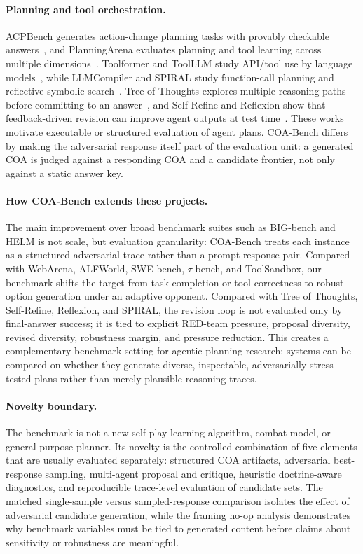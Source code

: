 \documentclass[letterpaper]{article}
\begin{document}
\paragraph{Planning and tool orchestration.}
ACPBench generates action-change planning tasks with provably checkable answers~\citep{kokel2025acpbench}, and PlanningArena evaluates planning and tool learning across multiple dimensions~\citep{zheng2025planningarena}. Toolformer and ToolLLM study API/tool use by language models~\citep{schick2023toolformer,qin2024toolllm}, while LLMCompiler and SPIRAL study function-call planning and reflective symbolic search~\citep{kim2024llmcompiler,zhang2026spiral}. Tree of Thoughts explores multiple reasoning paths before committing to an answer~\citep{yao2023tree}, and Self-Refine and Reflexion show that feedback-driven revision can improve agent outputs at test time~\citep{madaan2023selfrefine,shinn2023reflexion}. These works motivate executable or structured evaluation of agent plans. COA-Bench differs by making the adversarial response itself part of the evaluation unit: a generated COA is judged against a responding COA and a candidate frontier, not only against a static answer key.

\paragraph{How COA-Bench extends these projects.}
The main improvement over broad benchmark suites such as BIG-bench and HELM is not scale, but evaluation granularity: COA-Bench treats each instance as a structured adversarial trace rather than a prompt-response pair. Compared with WebArena, ALFWorld, SWE-bench, $\tau$-bench, and ToolSandbox, our benchmark shifts the target from task completion or tool correctness to robust option generation under an adaptive opponent. Compared with Tree of Thoughts, Self-Refine, Reflexion, and SPIRAL, the revision loop is not evaluated only by final-answer success; it is tied to explicit RED-team pressure, proposal diversity, revised diversity, robustness margin, and pressure reduction. This creates a complementary benchmark setting for agentic planning research: systems can be compared on whether they generate diverse, inspectable, adversarially stress-tested plans rather than merely plausible reasoning traces.

\paragraph{Novelty boundary.}
The benchmark is not a new self-play learning algorithm, combat model, or general-purpose planner. Its novelty is the controlled combination of five elements that are usually evaluated separately: structured COA artifacts, adversarial best-response sampling, multi-agent proposal and critique, heuristic doctrine-aware diagnostics, and reproducible trace-level evaluation of candidate sets. The matched single-sample versus sampled-response comparison isolates the effect of adversarial candidate generation, while the framing no-op analysis demonstrates why benchmark variables must be tied to generated content before claims about sensitivity or robustness are meaningful.
\end{document}
